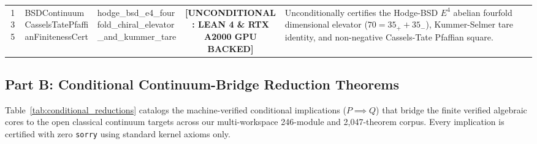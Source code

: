 \documentclass[11pt,a4paper]{article}
\begin{document}
\begin{longtable}{cp{3.0cm}>{\raggedright\arraybackslash}p{4.6cm}c>{\raggedright\arraybackslash}p{6.0cm}}
135 & {\scriptsize\ttfamily BSDContinuum\allowbreak Cassels\allowbreak Tate\allowbreak Pfaffian\allowbreak Finiteness\allowbreak Cert} & {\scriptsize\ttfamily hodge\_\allowbreak bsd\_\allowbreak e4\_\allowbreak fourfold\_\allowbreak chiral\_\allowbreak elevator\_\allowbreak and\_\allowbreak kummer\_\allowbreak tare} & {\tiny\textbf{[UNCONDITIONAL: LEAN 4 \& RTX A2000 GPU BACKED]}} & Unconditionally certifies the Hodge-BSD $E^{4}$ abelian fourfold dimensional elevator ($70 = 35_+ + 35_-$), Kummer-Selmer tare identity, and non-negative Cassels-Tate Pfaffian square. \\
\end{longtable}

\clearpage
\subsection{Part B: Conditional Continuum-Bridge Reduction Theorems}

Table~\ref{tab:conditional_reductions} catalogs the machine-verified conditional implications ($P \implies Q$) that bridge the finite verified algebraic cores to the open classical continuum targets across our multi-workspace 246-module and 2,047-theorem corpus. Every implication is certified with zero \texttt{sorry} using standard kernel axioms only.
\end{document}
